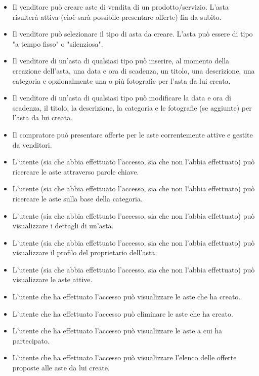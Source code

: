         \begin{itemize}
            \item Il venditore può creare aste di vendita di un prodotto/servizio. L'asta risulterà attiva (cioè sarà possibile presentare offerte) fin da subito.
            \item Il venditore può selezionare il tipo di asta da creare. L'asta può essere di tipo "a tempo fisso" o "silenziosa".
            \item Il venditore di un'asta di qualsiasi tipo può inserire, al momento della creazione dell'asta, una data e ora di scadenza, un titolo, una descrizione, una categoria e opzionalmente una o più fotografie per l'asta da lui creata.
            \item Il venditore di un'asta di qualsiasi tipo può modificare la data e ora di scadenza, il titolo, la descrizione, la categoria e le fotografie (se aggiunte) per l'asta da lui creata.
            \item Il compratore può presentare offerte per le aste correntemente attive e gestite da venditori.
        \end{itemize}
        \begin{itemize}
            \item L'utente (sia che abbia effettuato l'accesso, sia che non l'abbia effettuato) può ricercare le aste attraverso parole chiave.
            \item L'utente (sia che abbia effettuato l'accesso, sia che non l'abbia effettuato) può ricercare le aste sulla base della categoria.
            \item L'utente (sia che abbia effettuato l'accesso, sia che non l'abbia effettuato) può visualizzare i dettagli di un'asta.
            \item L'utente (sia che abbia effettuato l'accesso, sia che non l'abbia effettuato) può visualizzare il profilo del proprietario dell'asta.
            \item L'utente (sia che abbia effettuato l'accesso, sia che non l'abbia effettuato) può visualizzare le aste attive.
            \item L'utente che ha effettuato l'accesso può visualizzare le aste che ha creato.
            \item L'utente che ha effettuato l'accesso può eliminare le aste che ha creato.
            \item L'utente che ha effettuato l'accesso può visualizzare le aste a cui ha partecipato.
            \item L'utente che ha effettuato l'accesso può visualizzare l'elenco delle offerte proposte alle aste da lui create.
        \end{itemize}
